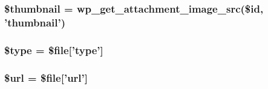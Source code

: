 \hypertarget{contact__ajax_8php_a7f835c9ddb57cb4a7f20c89382f45dab}{
\subsubsection[{\$thumbnail}]{\setlength{\rightskip}{0pt plus 5cm}\$thumbnail = wp\_\-get\_\-attachment\_\-image\_\-src(\$id, 'thumbnail')}}
\label{d6/d22/contact__ajax_8php_a7f835c9ddb57cb4a7f20c89382f45dab}
\hypertarget{contact__ajax_8php_a9a4a6fba2208984cabb3afacadf33919}{
\subsubsection[{\$type}]{\setlength{\rightskip}{0pt plus 5cm}\$type = \$file\mbox{[}'type'\mbox{]}}}
\label{d6/d22/contact__ajax_8php_a9a4a6fba2208984cabb3afacadf33919}
\hypertarget{contact__ajax_8php_acf215f34a917d014776ce684a9ee8909}{
\subsubsection[{\$url}]{\setlength{\rightskip}{0pt plus 5cm}\$url = \$file\mbox{[}'url'\mbox{]}}}
\label{d6/d22/contact__ajax_8php_acf215f34a917d014776ce684a9ee8909}
